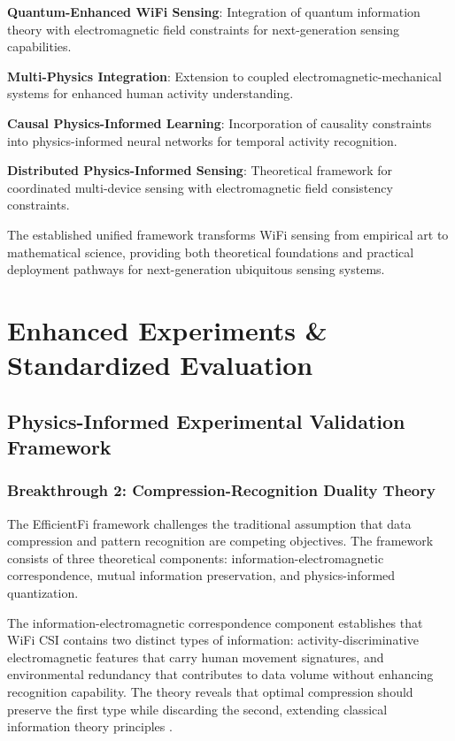\documentclass[journal]{IEEEtran}
\begin{document}
\textbf{Quantum-Enhanced WiFi Sensing}: Integration of quantum information theory with electromagnetic field constraints for next-generation sensing capabilities.

\textbf{Multi-Physics Integration}: Extension to coupled electromagnetic-mechanical systems for enhanced human activity understanding.

\textbf{Causal Physics-Informed Learning}: Incorporation of causality constraints into physics-informed neural networks for temporal activity recognition.

\textbf{Distributed Physics-Informed Sensing}: Theoretical framework for coordinated multi-device sensing with electromagnetic field consistency constraints.

The established unified framework transforms WiFi sensing from empirical art to mathematical science, providing both theoretical foundations and practical deployment pathways for next-generation ubiquitous sensing systems.


\section{Enhanced Experiments \& Standardized Evaluation}
\label{sec:experiments}

\subsection{Physics-Informed Experimental Validation Framework}

\subsubsection{Breakthrough 2: Compression-Recognition Duality Theory}

The EfficientFi framework \cite{chen2024efficientfi} challenges the traditional assumption that data compression and pattern recognition are competing objectives. The framework consists of three theoretical components: information-electromagnetic correspondence, mutual information preservation, and physics-informed quantization.

The information-electromagnetic correspondence component establishes that WiFi CSI contains two distinct types of information: activity-discriminative electromagnetic features that carry human movement signatures, and environmental redundancy that contributes to data volume without enhancing recognition capability. The theory reveals that optimal compression should preserve the first type while discarding the second, extending classical information theory principles \cite{cover1999elements}.
\end{document}
